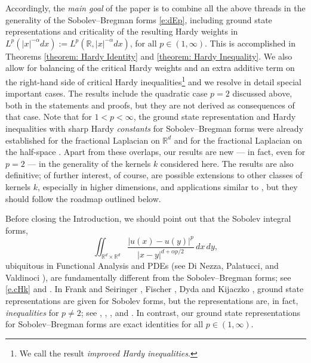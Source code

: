 \documentclass[12pt, a4paper]{amsart}
\newcommand{\kbm}[1]{\marginpar{\scriptsize\textcolor{red}{#1}}}
\newcommand{\R}{\mathbb{R}}
\begin{document}
Accordingly, the \textit{main goal} of the paper is to combine all the above threads in the generality of the Sobolev--Bregman forms \eqref{e:dEp}, including ground state representations and criticality of the resulting Hardy weights in $L^p(|x|^{-\alpha}dx):=L^p(\R,|x|^{-\alpha}dx)$, for all $p\in (1,\infty)$. This is accomplished in Theorems \ref{theorem: Hardy Identity} and \ref{theorem: Hardy Inequality}. 
We also allow for 
balancing of the critical Hardy weights
and
an extra additive term on the right-hand side of critical Hardy inequalities\footnote{We call the result \emph{improved Hardy inequalities}.} and
we
resolve in detail special important cases.
The results include the quadratic case \( p = 2 \) discussed above,  both in the statements and proofs, but they are not derived as consequences of that case.
% 
Note that for $1<p<\infty$, the ground state representation and Hardy inequalities with sharp Hardy \textit{constants} 
for Sobolev--Bregman forms were already established for the fractional Laplacian on $\mathbb{R}^d$ 
\cite[Theorems~1 and~2]{MR4372148} and for the fractional Laplacian on the half-space 
\cite[Lemma~2.1 and Theorem~1.1]{MR4720167}. 
Apart from these overlaps, our results are new — in fact, even for $p=2$ — in the generality of the kernels $k$ considered here. The results are also definitive; of further interest, of course, are possible extensions to other classes of kernels $k$, especially in higher dimensions, and applications similar to \cite{MR4372148}, but they should follow the roadmap outlined below.




Before closing the Introduction, we should point out that the Sobolev  integral forms,
\begin{equation}\label{e.ddpf}
\iint_{\mathbb{R}^d \times \mathbb{R}^d} \frac{|u(x) - u(y)|^p}{|x - y|^{d + \alpha p/2}} \, dx \, dy,
\end{equation}
ubiquitous in Functional Analysis and  PDEs (see Di Nezza, Palatucci, and Valdinoci \cite{MR2944369}),
are fundamentally different from the Sobolev--Bregman forms; 
see \eqref{e.cHk} and \cite{MR4885983}.
In Frank and Seiringer \cite{MR2469027}, Fischer  \cite{MR4597627}, Dyda and Kijaczko \cite{MR4708667, MR4705882}, 
ground state representations are given for Sobolev forms, but the representations are, in fact, \textit{inequalities} for $p\neq 2$; see \cite[Proposition 2.3]{MR2469027}, \cite{MR4597627}, \cite[Theorem 1.2, 1.3]{MR4705882}, and  \cite[Theorem 2]{MR4708667}. In contrast, our ground state representations  for 
Sobolev--Bregman forms are exact identities for all $p\in (1,\infty)$. 
\end{document}
